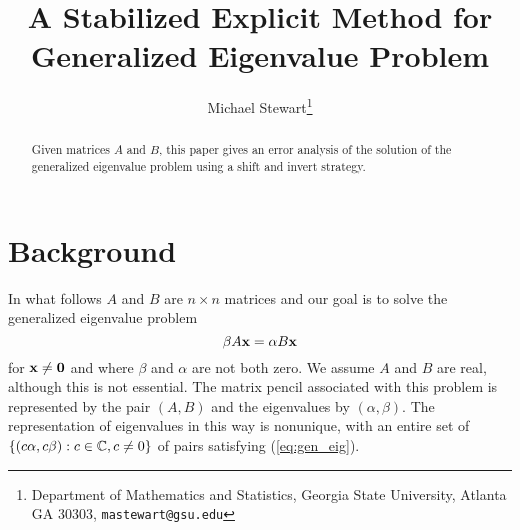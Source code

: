 \documentclass[12pt]{article}
\title{A Stabilized Explicit Method for Generalized Eigenvalue Problem}
\author{Michael Stewart\thanks{Department of Mathematics and Statistics,
    Georgia State University, Atlanta GA 30303, {\tt mastewart@gsu.edu}}}
\def\vec#1{{\bf #1}}
\begin{document}
\maketitle
\begin{abstract}
  Given matrices $A$ and $B$, this paper gives an error analysis
  of the solution of the generalized eigenvalue problem using
  a shift and invert strategy.
\end{abstract}
\pagestyle{myheadings}
\thispagestyle{plain}

\section{Background}
\label{sec:background}

In what follows $A$ and $B$ are $n\times n$ matrices and our goal is
to solve the generalized eigenvalue problem
\begin{equation}
  \label{eq:gen_eig}
  \beta A \vec{x} = \alpha B \vec{x}
\end{equation}
for $\vec{x}\neq \vec{0}$ and where $\beta$ and $\alpha$ are not both
zero.  We assume $A$ and $B$ are real, although this is not essential.
The matrix pencil associated with this problem is represented by the
pair $(A,B)$ and the eigenvalues by $(\alpha, \beta)$.  The
representation of eigenvalues in this way is nonunique, with an entire
set of $\{(c\alpha, c\beta): c \in {\mathbb C}, c\neq 0\}$ of pairs satisfying
(\ref{eq:gen_eig}).
\end{document}
